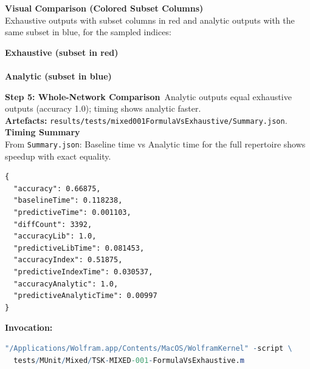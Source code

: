 \documentclass{article}
\begin{document}
\textbf{Visual Comparison (Colored Subset Columns)}\\ Exhaustive outputs with subset columns in red and analytic outputs with the same subset in blue, for the sampled indices:\\
\begin{center}
\textbf{Exhaustive (subset in red)}\\

\\[0.5em]
\textbf{Analytic (subset in blue)}\\

\end{center}
\textbf{Step 5: Whole-Network Comparison}\
Analytic outputs equal exhaustive outputs (accuracy 1.0); timing shows analytic faster.\\
\textbf{Artefacts:} \texttt{results/tests/mixed001FormulaVsExhaustive/Summary.json}.\\
\textbf{Timing Summary}\\ From \texttt{Summary.json}: Baseline time vs Analytic time for the full repertoire shows speedup with exact equality.
\begin{lstlisting}[language={}]
{
  "accuracy": 0.66875,
  "baselineTime": 0.118238,
  "predictiveTime": 0.001103,
  "diffCount": 3392,
  "accuracyLib": 1.0,
  "predictiveLibTime": 0.081453,
  "accuracyIndex": 0.51875,
  "predictiveIndexTime": 0.030537,
  "accuracyAnalytic": 1.0,
  "predictiveAnalyticTime": 0.00997
}
\end{lstlisting}
\textbf{Invocation:}
\begin{lstlisting}[language=Mathematica]
"/Applications/Wolfram.app/Contents/MacOS/WolframKernel" -script \
  tests/MUnit/Mixed/TSK-MIXED-001-FormulaVsExhaustive.m
\end{lstlisting}
\end{document}
